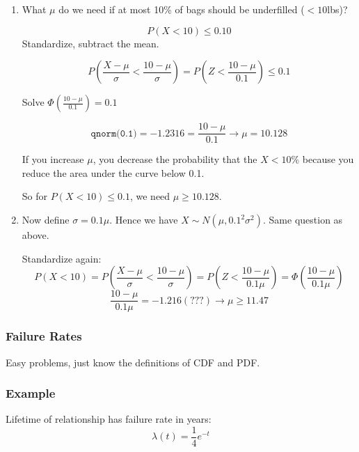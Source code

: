 \documentclass{report}
\newcommand{\var}{\sigma^2}
\begin{document}
\begin{enumerate}
\item What $\mu$ do we need if at most 10\% of bags should be underfilled ($<10$lbs)?

$$ P(X < 10) \leq 0.10 $$
Standardize, subtract the mean.

$$P(\frac{X -\mu}{\sigma} < \frac{10-\mu}{\sigma}) = P(Z < \frac{10-\mu}{0.1}) \leq 0.1$$

Solve $\Phi(\frac{10-\mu}{0.1}) = 0.1$ 

$$\texttt{qnorm(0.1)} = -1.2316 = \frac{10-\mu}{0.1} \rightarrow \mu=10.128$$

If you increase $\mu$, you decrease the probability that the $X < 10\%$ because you reduce the area under the curve below 0.1.

So for $P(X < 10) \leq 0.1$, we need $\mu \geq 10.128$.

\item Now define $\sigma=0.1 \mu$. Hence we have $X \sim N(\mu, 0.1^2\var)$. Same question as above.

Standardize again: $$ P(X < 10) = P \left( \frac{X -\mu}{\sigma} < \frac{10-\mu}{\sigma} \right) = P \left(Z < \frac{10-\mu}{0.1 \mu} \right) = \Phi \left( \frac{10-\mu}{0.1 \mu} \right)$$
$$ \frac{10-\mu}{0.1\mu} = -1.216 (???) \rightarrow \mu \geq 11.47 $$



\end{enumerate}

\subsubsection{Failure Rates}

Easy problems, just know the definitions of CDF and PDF. 

\subsubsection*{Example}

Lifetime of relationship has failure rate in years: $$\lambda(t) = \frac{1}{4} e^{-t}$$
\end{document}
